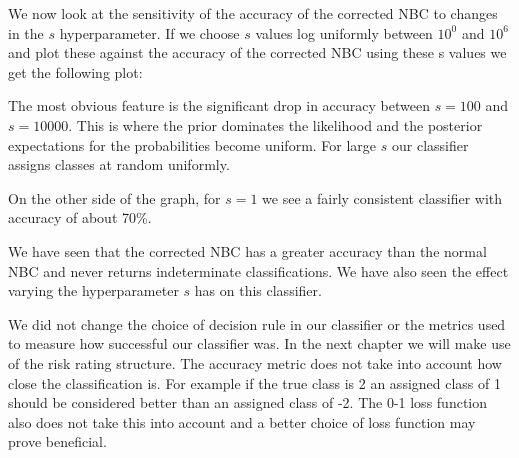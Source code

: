 We now look at the sensitivity of the accuracy of the corrected NBC to changes in the $s$ hyperparameter.
If we choose $s$ values log uniformly between $10^{0}$ and $10^{6}$ and plot these against the accuracy of the corrected NBC using these s values we get the following plot:
\begin{center}
\end{center}

The most obvious feature is the significant drop in accuracy between $s=100$ and $s=10000$.
This is where the prior dominates the likelihood and the posterior expectations for the probabilities become uniform.
For large $s$ our classifier assigns classes at random uniformly.

On the other side of the graph, for $s=1$ we see a fairly consistent classifier with accuracy of about 70\%.

We have seen that the corrected NBC has a greater accuracy than the normal NBC and never returns indeterminate classifications.
We have also seen the effect varying the hyperparameter $s$ has on this classifier.

We did not change the choice of decision rule in our classifier or the metrics used to measure how successful our classifier was.
In the next chapter we will make use of the risk rating structure.
The accuracy metric does not take into account how close the classification is.
For example if the true class is 2 an assigned class of 1 should be considered better than an assigned class of -2.
The 0-1 loss function also does not take this into account and a better choice of loss function may prove beneficial.